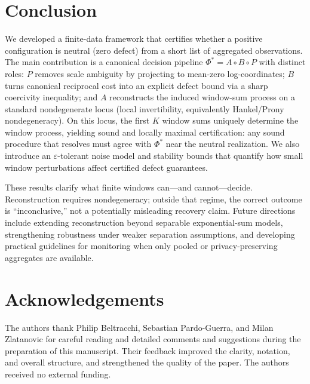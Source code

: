 \documentclass[11pt,reqno]{amsart}
\theoremstyle{definition}
\theoremstyle{remark}
\newcommand{\1}{\mathbf{1}}
\begin{document}
\section*{Conclusion}
We developed a finite-data framework that certifies whether a positive configuration is neutral (zero defect) from a short list of aggregated observations. The main contribution is a canonical decision pipeline $\Phi^\ast=A\circ B\circ P$ with distinct roles: $P$ removes scale ambiguity by projecting to mean-zero log-coordinates; $B$ turns canonical reciprocal cost into an explicit defect bound via a sharp coercivity inequality; and $A$ reconstructs the induced window-sum process on a standard nondegenerate locus (local invertibility, equivalently Hankel/Prony nondegeneracy). On this locus, the first $K$ window sums uniquely determine the window process, yielding sound and locally maximal certification: any sound procedure that resolves must agree with $\Phi^\ast$ near the neutral realization. We also introduce an $\varepsilon$-tolerant noise model and stability bounds that quantify how small window perturbations affect certified defect guarantees.

These results clarify what finite windows can—and cannot—decide. Reconstruction requires nondegeneracy; outside that regime, the correct outcome is “inconclusive,” not a potentially misleading recovery claim. Future directions include extending reconstruction beyond separable exponential-sum models, strengthening robustness under weaker separation assumptions, and developing practical guidelines for monitoring when only pooled or privacy-preserving aggregates are available.



\section*{Acknowledgements}
The authors thank Philip Beltracchi, Sebastian Pardo-Guerra, and Milan Zlatanovic for careful reading and detailed comments and suggestions during the preparation of this manuscript. Their feedback improved the clarity, notation, and overall structure, and strengthened the quality of the paper. The authors received no external funding.
\end{document}
